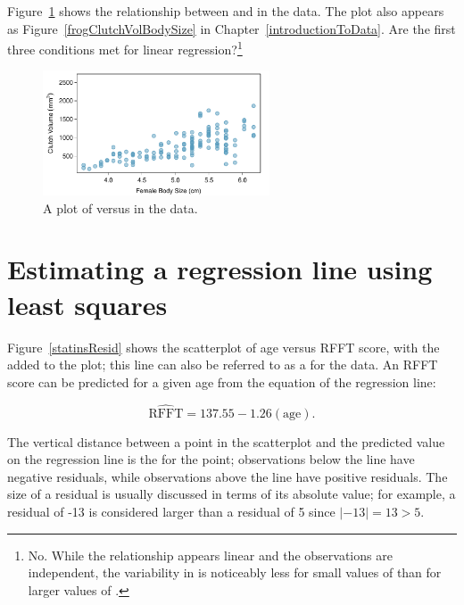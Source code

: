 \begin{exercise} \label{nonConstantVariance}
Figure~\ref{frogClutchVolBodySizeRegress} shows the relationship between  and  in the  data.  The plot also appears as Figure~\ref{frogClutchVolBodySize} in Chapter~\ref{introductionToData}. Are the first three conditions met for linear regression?\footnote{No. While the relationship appears linear and the observations are independent, the variability in  is noticeably less for small values of  than for larger values of .}

\begin{figure}[h!]
	\centering
	\includegraphics[width=0.6\textwidth]
	{ch_intro_to_data_oi_biostat/figures/frogClutchVolBodySize/frogClutchVolBodySize}
	\caption{A plot of  versus  in the  data.}
	\label{frogClutchVolBodySizeRegress}
\end{figure}


\end{exercise}

\section{Estimating a regression line using least squares}
\label{estimatingLeastSquaresLine}


Figure~\ref{statinsResid} shows the scatterplot of age versus RFFT score, with the  added to the plot; this line can also be referred to as a  for the data. An RFFT score can be predicted for a given age from the equation of the regression line:

\[\widehat{\text{RFFT}} = 137.55 - 1.26(\text{age}). \]


The vertical distance between a point in the scatterplot and the predicted value on the regression line is the  for the point; observations below the line have negative residuals, while observations above the line have positive residuals. The size of a residual is usually discussed in terms of its absolute value; for example, a residual of -13 is considered larger than a residual of 5 since $|-13| = 13 > 5$.

